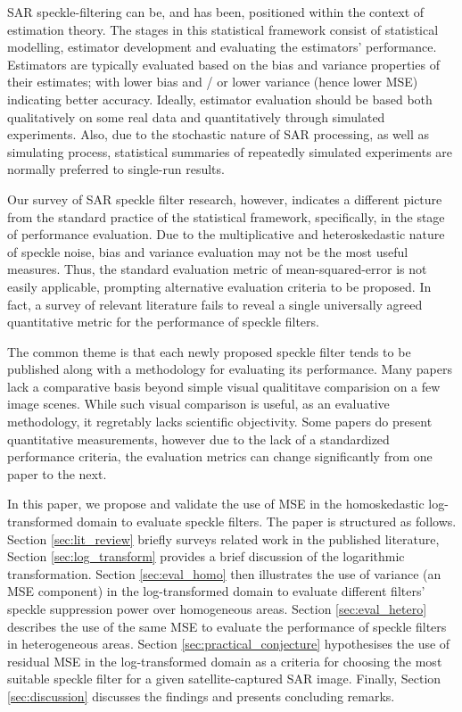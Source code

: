 \documentclass[journal]{IEEEtran}
\begin{document}
SAR speckle-filtering can be, and has been, positioned within the context of estimation theory\cite{Touzi_2002_TGRS}. 
The stages in this statistical framework consist of statistical modelling, estimator development and evaluating the estimators' performance. 
Estimators are typically evaluated based on the bias and variance properties of their estimates; 
	with lower bias and / or lower variance (hence lower MSE) indicating better accuracy.
Ideally, estimator evaluation should be based both qualitatively on some real data and quantitatively through simulated experiments. 
Also, due to the stochastic nature of SAR processing, as well as simulating process, 
	statistical summaries of repeatedly simulated experiments are normally preferred to single-run results.

Our survey of SAR speckle filter research, however, indicates 
	a different picture from the standard practice of the statistical framework, 
	specifically, in the stage of performance evaluation. 
Due to the multiplicative and heteroskedastic nature of speckle noise, 
	bias and variance evaluation may not be the most useful measures. 
Thus, the standard evaluation metric of mean-squared-error is not easily applicable,
	prompting alternative evaluation criteria to be proposed.
In fact, a survey of relevant literature fails to reveal 
	a single universally agreed quantitative metric for the performance of speckle filters.

The common theme is that each newly proposed speckle filter tends to be published along with a methodology for evaluating its performance.
Many papers lack a comparative basis beyond simple visual qualititave comparision on a few image scenes. 
While such visual comparison is useful, as an evaluative methodology, it regretably lacks scientific objectivity. 
Some papers do present quantitative measurements, 
	however  due to the lack of a standardized performance criteria, 
	the evaluation metrics can change significantly from one paper to the next.

In this paper, we propose and validate the use of MSE in the homoskedastic log-transformed domain to evaluate speckle filters. 
The paper is structured as follows.
Section \ref{sec:lit_review} briefly surveys related work in the published literature, Section \ref{sec:log_transform} provides a brief discussion of the logarithmic transformation.
Section \ref{sec:eval_homo} then illustrates the use of variance (an MSE component) in the log-transformed domain to evaluate different filters' speckle suppression power over homogeneous areas.
Section \ref{sec:eval_hetero} describes the use of the same MSE to evaluate the performance of speckle filters in heterogeneous areas.
Section \ref{sec:practical_conjecture} hypothesises the use of residual MSE in the log-transformed domain 
	as a criteria for choosing the most suitable speckle filter for a given satellite-captured SAR image.
Finally, Section \ref{sec:discussion} discusses the findings and presents concluding remarks.
\end{document}
